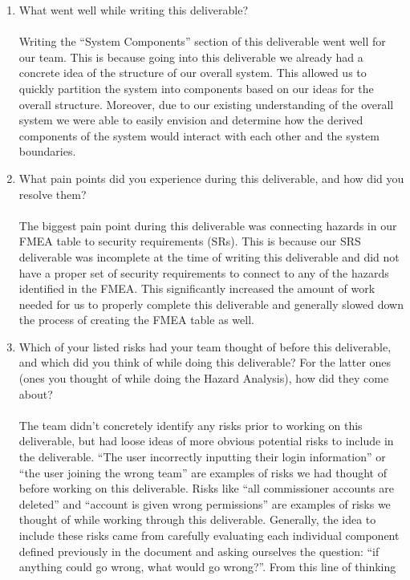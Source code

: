 \documentclass{article}
\begin{document}
\begin{enumerate}
  \item What went well while writing this deliverable?\\\\
  Writing the “System Components” section of this deliverable went well for our 
  team. This is because going into this deliverable we already had a concrete 
  idea of the structure of our overall system. This allowed us to quickly 
  partition the system into components based on our ideas for the overall 
  structure. Moreover, due to our existing understanding of the overall system 
  we were able to easily envision and determine how the derived components of 
  the system would interact with each other and the system boundaries.
  \item What pain points did you experience during this deliverable, and how
  did you resolve them?\\\\
  The biggest pain point during this deliverable was connecting hazards in our 
  FMEA table to security requirements (SRs). This is because our SRS deliverable 
  was incomplete at the time of writing this deliverable and did not have a 
  proper set of security requirements to connect to any of the hazards 
  identified in the FMEA. This significantly increased the amount of work 
  needed for us to properly complete this deliverable and generally slowed down 
  the process of creating the FMEA table as well.
  \item Which of your listed risks had your team thought of before this
  deliverable, and which did you think of while doing this deliverable? For
  the latter ones (ones you thought of while doing the Hazard Analysis), how
  did they come about?\\\\
  The team didn’t concretely identify any risks prior to working on this 
  deliverable, but had loose ideas of more obvious potential risks to include 
  in the deliverable. “The user incorrectly inputting their login information” 
  or “the user joining the wrong team” are examples of risks we had thought of 
  before working on this deliverable. Risks like “all commissioner accounts are 
  deleted” and “account is given wrong permissions” are examples of risks we 
  thought of while working through this deliverable. Generally, the idea to 
  include these risks came from carefully evaluating each individual component 
  defined previously in the document and asking ourselves the question: 
  “if anything could go wrong, what would go wrong?”. From this line of thinking 

\end{enumerate}
\end{document}
